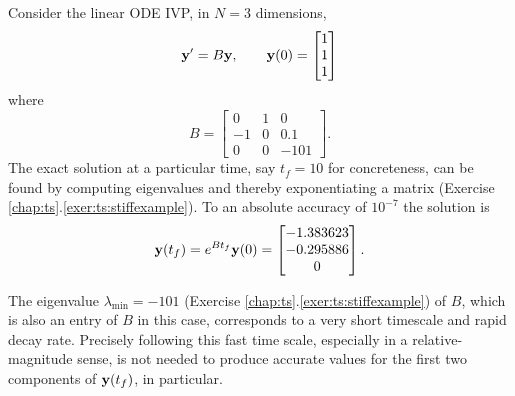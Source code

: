 \noindent\hrulefill
\begin{example}  \label{ex:ts:odestiff}  Consider the linear ODE IVP, in $N=3$ dimensions,
\begin{equation}
   \mathbf{y}' = B \mathbf{y}, \qquad \mathbf{y}(0) = \begin{bmatrix} 1 \\ 1 \\ 1 \end{bmatrix} \label{eq:ts:stiffexample}
\end{equation}
where
\begin{equation}
   B = \begin{bmatrix} 0 & 1 & 0 \\
                      -1 & 0 & 0.1 \\
                       0 & 0 & -101 \end{bmatrix}. \label{eq:ts:stiffexamplematrix}
\end{equation}
The exact solution at a particular time, say $t_f=10$ for concreteness, can be found by computing eigenvalues and thereby exponentiating a matrix (Exercise \ref{chap:ts}.\ref{exer:ts:stiffexample}).  To an absolute accuracy of $10^{-7}$ the solution is
\begin{equation}
    \mathbf{y}(t_f) = e^{B t_f} \mathbf{y}(0) = \begin{bmatrix} -1.383623 \\
                                                 -0.295886 \\
                                                  0 \end{bmatrix}.\label{eq:ts:stiffsoln}
\end{equation}

The eigenvalue $\lambda_{\min}=-101$ (Exercise \ref{chap:ts}.\ref{exer:ts:stiffexample}) of $B$, which is also an entry of $B$ in this case, corresponds to a very short timescale and rapid decay rate.  Precisely following this fast time scale, especially in a relative-magnitude sense, is not needed to produce accurate values for the first two components of $\mathbf{y}(t_f)$, in particular.


\end{example}
